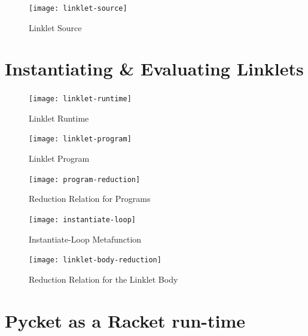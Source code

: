 \documentclass[a4paper]{article}
\begin{document}
\begin{figure}[h!]
\begin{center}
\texttt{[image: linklet-source]}
\caption{Linklet Source}
\end{center}
\end{figure}

\section{Instantiating \& Evaluating Linklets}

\paragraph{} 

\begin{figure}[h!]
\begin{center}
\texttt{[image: linklet-runtime]}
\caption{Linklet Runtime}
\end{center}
\end{figure}

\begin{figure}[h!]
\begin{center}
\texttt{[image: linklet-program]}
\caption{Linklet Program}
\end{center}
\end{figure}

\begin{center}
\begin{figure}[h!]
    \texttt{[image: program-reduction]}
    \caption{Reduction Relation for Programs}
\end{figure}
\end{center}

\begin{figure}[h!]
\begin{center}
\texttt{[image: instantiate-loop]}
\caption{Instantiate-Loop Metafunction}
\end{center}
\end{figure}

\begin{figure}[h!]
\begin{center}
\texttt{[image: linklet-body-reduction]}
\caption{Reduction Relation for the Linklet Body}
\end{center}
\end{figure}


\section{Pycket as a Racket run-time}
\end{document}
